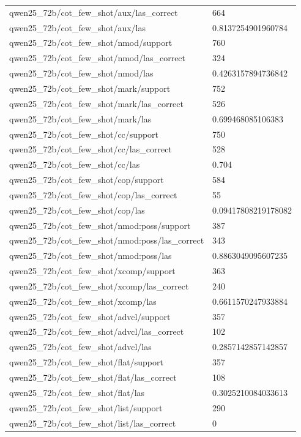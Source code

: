 \begin{tabular}{ll}
qwen25\_72b/cot\_few\_shot/aux/las\_correct & 664 \\
qwen25\_72b/cot\_few\_shot/aux/las & 0.8137254901960784 \\
qwen25\_72b/cot\_few\_shot/nmod/support & 760 \\
qwen25\_72b/cot\_few\_shot/nmod/las\_correct & 324 \\
qwen25\_72b/cot\_few\_shot/nmod/las & 0.4263157894736842 \\
qwen25\_72b/cot\_few\_shot/mark/support & 752 \\
qwen25\_72b/cot\_few\_shot/mark/las\_correct & 526 \\
qwen25\_72b/cot\_few\_shot/mark/las & 0.699468085106383 \\
qwen25\_72b/cot\_few\_shot/cc/support & 750 \\
qwen25\_72b/cot\_few\_shot/cc/las\_correct & 528 \\
qwen25\_72b/cot\_few\_shot/cc/las & 0.704 \\
qwen25\_72b/cot\_few\_shot/cop/support & 584 \\
qwen25\_72b/cot\_few\_shot/cop/las\_correct & 55 \\
qwen25\_72b/cot\_few\_shot/cop/las & 0.09417808219178082 \\
qwen25\_72b/cot\_few\_shot/nmod:poss/support & 387 \\
qwen25\_72b/cot\_few\_shot/nmod:poss/las\_correct & 343 \\
qwen25\_72b/cot\_few\_shot/nmod:poss/las & 0.8863049095607235 \\
qwen25\_72b/cot\_few\_shot/xcomp/support & 363 \\
qwen25\_72b/cot\_few\_shot/xcomp/las\_correct & 240 \\
qwen25\_72b/cot\_few\_shot/xcomp/las & 0.6611570247933884 \\
qwen25\_72b/cot\_few\_shot/advcl/support & 357 \\
qwen25\_72b/cot\_few\_shot/advcl/las\_correct & 102 \\
qwen25\_72b/cot\_few\_shot/advcl/las & 0.2857142857142857 \\
qwen25\_72b/cot\_few\_shot/flat/support & 357 \\
qwen25\_72b/cot\_few\_shot/flat/las\_correct & 108 \\
qwen25\_72b/cot\_few\_shot/flat/las & 0.3025210084033613 \\
qwen25\_72b/cot\_few\_shot/list/support & 290 \\
qwen25\_72b/cot\_few\_shot/list/las\_correct & 0 \\

\end{tabular}
